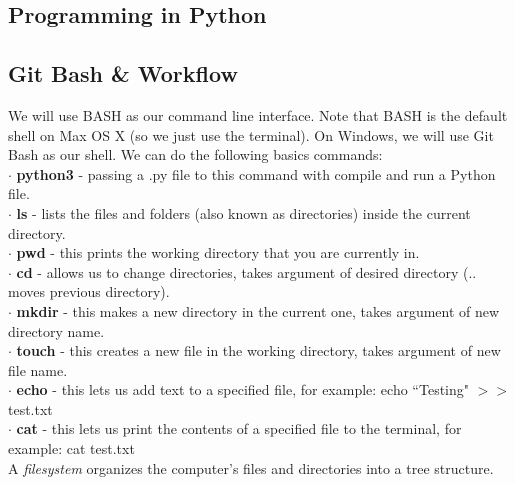 \documentclass[11pt, a4paper]{article}
\begin{document}
\begin{spacing}{1.1}
	\section{Programming in Python}
	\subsection{Git Bash \& Workflow}
	We will use BASH as our command line interface. Note that BASH is the default shell on Max OS X (so we just use the terminal). On Windows, we will use Git Bash as our shell. We can do the following basics commands: \vspace*{1mm} \\
	\hspace*{1.5mm} $\cdot$ \textbf{python3} - passing a .py file to this command with compile and run a Python file. \\
	\hspace*{1.5mm} $\cdot$ \textbf{ls} - lists the files and folders (also known as directories) inside the current directory. \\
	\hspace*{1.5mm} $\cdot$ \textbf{pwd} - this prints the working directory that you are currently in. \\
	\hspace*{1.5mm} $\cdot$ \textbf{cd} - allows us to change directories, takes argument of desired directory (.. moves previous directory). \\
	\hspace*{1.5mm} $\cdot$ \textbf{mkdir} - this makes a new directory in the current one, takes argument of new directory name. \\
	\hspace*{1.5mm} $\cdot$ \textbf{touch} - this creates a new file in the working directory, takes argument of new file name. \\
	\hspace*{1.5mm} $\cdot$ \textbf{echo} - this lets us add text to a specified file, for example: echo ``Testing" $>>$ test.txt \\
	\hspace*{1.5mm} $\cdot$ \textbf{cat} - this lets us print the contents of a specified file to the terminal, for example: cat test.txt \vspace*{2mm}\\
	A \textit{filesystem} organizes the computer's files and directories into a tree structure. \\

\end{spacing}
\end{document}
